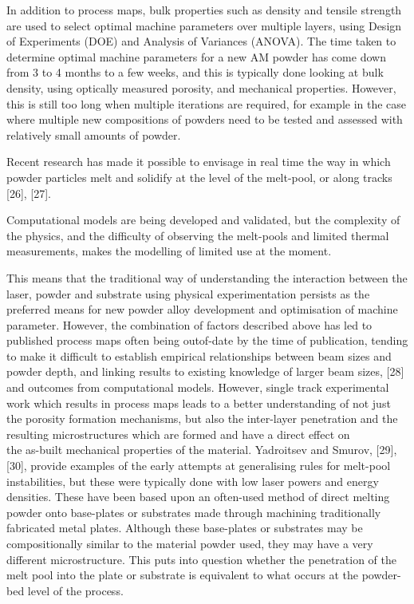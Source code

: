 \documentclass[10pt]{article}
\begin{document}
In addition to process maps, bulk properties such as density and tensile strength are used to select optimal machine parameters over multiple layers, using Design of Experiments (DOE) and Analysis of Variances (ANOVA). The time taken to determine optimal machine parameters for a new AM powder has come down from 3 to 4 months to a few weeks, and this is typically done looking at bulk density, using optically measured porosity, and mechanical properties. However, this is still too long when multiple iterations are required, for example in the case where multiple new compositions of powders need to be tested and assessed with relatively small amounts of powder.

Recent research has made it possible to envisage in real time the way in which powder particles melt and solidify at the level of the melt-pool, or along tracks [26], [27].

Computational models are being developed and validated, but the complexity of the physics, and the difficulty of observing the melt-pools and limited thermal measurements, makes the modelling of limited use at the moment.

This means that the traditional way of understanding the interaction between the laser, powder and substrate using physical experimentation persists as the preferred means for new powder alloy development and optimisation of machine parameter. However, the combination of factors described above has led to published process maps often being outof-date by the time of publication, tending to make it difficult to establish empirical relationships between beam sizes and powder depth, and linking results to existing knowledge of larger beam sizes, [28] and outcomes from computational models. However, single track experimental work which results in process maps leads to a better understanding of not just the porosity formation mechanisms, but also the inter-layer penetration and the resulting microstructures which are formed and have a direct effect on\\
the as-built mechanical properties of the material. Yadroitsev and Smurov, [29], [30], provide examples of the early attempts at generalising rules for melt-pool instabilities, but these were typically done with low laser powers and energy densities. These have been based upon an often-used method of direct melting powder onto base-plates or substrates made through machining traditionally fabricated metal plates. Although these base-plates or substrates may be compositionally similar to the material powder used, they may have a very different microstructure. This puts into question whether the penetration of the melt pool into the plate or substrate is equivalent to what occurs at the powder-bed level of the process.
\end{document}
